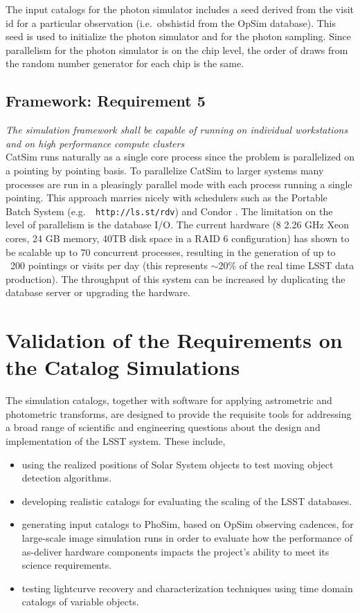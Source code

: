 \documentclass[11pt]{article}
\begin{document}
The input catalogs for the photon simulator includes a seed derived
from the visit id for a particular observation (i.e.\ obshistid from
the OpSim database). This seed is used to initialize the photon
simulator and for the photon sampling. Since parallelism for the
photon simulator is on the chip level, the order of draws from the
random number generator for each chip is the same.


\subsection{Framework: Requirement 5}

{\it The simulation framework shall be capable of running on individual workstations 
and on high performance compute clusters}\\


CatSim runs naturally as a single core process since the problem is
parallelized on a pointing by pointing basis.  To parallelize CatSim
to larger systems many processes are run in a pleasingly parallel mode
with each process running a single pointing.  This approach marries
nicely with schedulers such as the Portable Batch System (e.g.\ {\tt
  http://ls.st/rdv}) and Condor \citep{condor}.  The
limitation on the level of parallelism is the database I/O.  The
current hardware (8 2.26 GHz Xeon cores, 24 GB memory, 40TB disk space
in a RAID 6 configuration) has shown to be scalable up to 70
concurrent processes, resulting in the generation of up to ~200
pointings or visits per day (this represents $\sim$20\% of the real
time LSST data production).  The throughput of this system can be
increased by duplicating the database server or upgrading the hardware.

\section{Validation of the Requirements on the Catalog Simulations}

The simulation catalogs, together with software for applying
astrometric and photometric transforms, are designed to provide the
requisite tools for addressing a broad range of scientific and
engineering questions about the design and implementation of the LSST
system. These include,
\begin{itemize}
\item using the realized positions of Solar System objects to
  test moving object detection algorithms.
\item developing realistic  catalogs for evaluating the scaling of the LSST databases.
\item generating input catalogs to PhoSim, based on OpSim observing
  cadences, for large-scale image simulation runs in order to evaluate
  how the performance of as-deliver hardware components impacts the
  project's ability to meet its science requirements.
\item testing lightcurve recovery and characterization techniques
  using time domain catalogs of variable objects.
\end{itemize}
\end{document}
